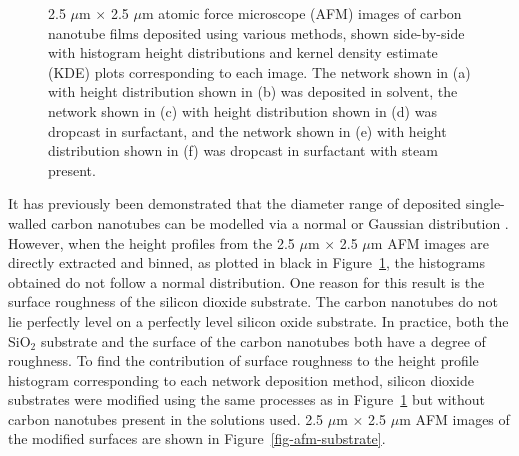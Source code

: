 \documentclass[
  a4paper,
]{scrbook}
\begin{document}
\begin{figure}
\begin{minipage}[t]{0.47\linewidth}
{{}

}

\subcaption{\label{fig-steaming-network-histogram}}
\end{minipage}%

\caption{\label{fig-afm-morphology}2.5 \(\mu\)m \(\times\) 2.5 \(\mu\)m
atomic force microscope (AFM) images of carbon nanotube films deposited
using various methods, shown side-by-side with histogram height
distributions and kernel density estimate (KDE) plots corresponding to
each image. The network shown in (a) with height distribution shown in
(b) was deposited in solvent, the network shown in (c) with height
distribution shown in (d) was dropcast in surfactant, and the network
shown in (e) with height distribution shown in (f) was dropcast in
surfactant with steam present.}

\end{figure}

It has previously been demonstrated that the diameter range of deposited
single-walled carbon nanotubes can be modelled via a normal or Gaussian
distribution \autocite{LeMieux2008,Liu2013,Vobornik2023}. However, when
the height profiles from the 2.5 \(\mu\)m \(\times\) 2.5 \(\mu\)m AFM
images are directly extracted and binned, as plotted in black in
Figure~\ref{fig-afm-morphology}, the histograms obtained do not follow a
normal distribution. One reason for this result is the surface roughness
of the silicon dioxide substrate. The carbon nanotubes do not lie
perfectly level on a perfectly level silicon oxide substrate. In
practice, both the SiO\(_2\) substrate and the surface of the carbon
nanotubes both have a degree of roughness. To find the contribution of
surface roughness to the height profile histogram corresponding to each
network deposition method, silicon dioxide substrates were modified
using the same processes as in Figure~\ref{fig-afm-morphology} but
without carbon nanotubes present in the solutions used. 2.5 \(\mu\)m
\(\times\) 2.5 \(\mu\)m AFM images of the modified surfaces are shown in
Figure~\ref{fig-afm-substrate}.
\end{document}
